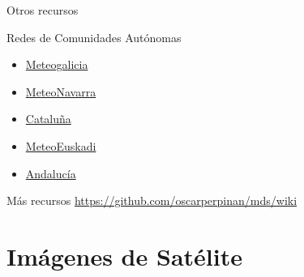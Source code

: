 \documentclass[aspectratio=169, usenames,svgnames,dvipsnames]{beamer}
\begin{document}
\begin{frame}[label={sec:org17d738e}]{Otros recursos}
\begin{block}{Redes de Comunidades Autónomas}
\begin{itemize}
\item \href{https://www.meteogalicia.gal/observacion/estacions/estacions.action?request\_locale=es}{Meteogalicia}
\item \href{http://meteo.navarra.es/estaciones/mapadeestaciones.cfm}{MeteoNavarra}
\item \href{http://www.meteo.cat/observacions/xema}{Cataluña}
\item \href{https://www.euskalmet.euskadi.eus/s07-5853x/es/meteorologia/datos/mapaesta.apl?e=5}{MeteoEuskadi}
\item \href{http://www.juntadeandalucia.es/medioambiente/servtc5/WebClima/?lr\%3Dlang\_es}{Andalucía}
\end{itemize}
\end{block}
\begin{block}{Más recursos}
\url{https://github.com/oscarperpinan/mds/wiki}
\end{block}
\end{frame}
\section{Imágenes de Satélite}
\label{sec:orgf8a93db}
\end{document}
